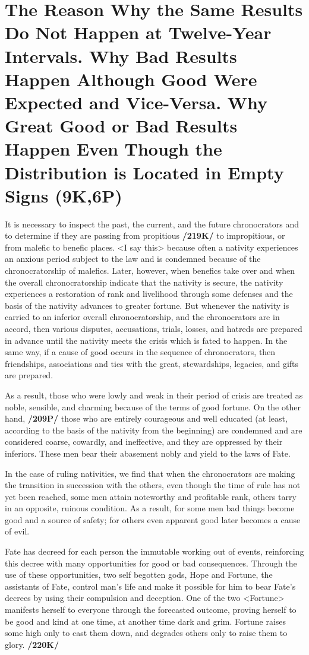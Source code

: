 \section{The Reason Why the Same Results Do Not Happen at Twelve-Year Intervals. Why Bad Results Happen Although Good Were Expected and Vice-Versa. Why Great Good or Bad Results Happen Even Though the Distribution is Located in Empty Signs (9K,6P)}

It is necessary to inspect the past, the current, and the future chronocrators and to determine if they are passing from propitious \textbf{/219K/} to impropitious, or from malefic to benefic places. <I say this> because often a nativity experiences an anxious period subject to the law and is condemned because of the
chronocratorship of malefics. Later, however, when benefics take over and when the overall chronocratorship indicate that the nativity is secure, the nativity experiences a restoration of rank and livelihood
through some defenses and the basis of the nativity advances to greater fortune. But whenever the nativity is carried to an inferior overall chronocratorship, and the chronocrators are in accord, then various disputes, accusations, trials, losses, and hatreds are prepared in advance until the nativity meets the crisis which is fated to happen. 
In the same way, if a cause of good occurs in the sequence of chronocrators, then friendships, associations and ties with the great, stewardships, legacies, and gifts are prepared.

As a result, those who were lowly and weak in their period of crisis are treated as noble, sensible, and charming because of the terms of good fortune. On the other hand, \textbf{/209P/} those who are entirely
courageous and well educated (at least, according to the basis of the nativity from the beginning) are condemned and are considered coarse, cowardly, and ineffective, and they are oppressed by their inferiors. These men bear their abasement nobly and yield to the laws of Fate. 

In the case of ruling nativities, we find that when the chronocrators are making the transition in succession with the others, even though the time of rule has not yet been reached, some men attain noteworthy and profitable rank, others tarry in an opposite, ruinous condition. As a result, for some men bad things become good and a source of safety; for others even apparent good later becomes a cause of evil.

  
Fate has decreed for each person the immutable working out of events, reinforcing this decree with many opportunities for good or bad consequences. Through the use of these opportunities, two self begotten gods, Hope and Fortune, the assistants of Fate, control man’s life and make it possible for him to bear Fate’s decrees by using their compulsion and deception. One of the two <Fortune> manifests herself to everyone through the forecasted outcome, proving herself to be good and kind at one time, at another time dark and grim. Fortune raises some high only to cast them down, and degrades others only to raise them to glory. \textbf{/220K/} 

